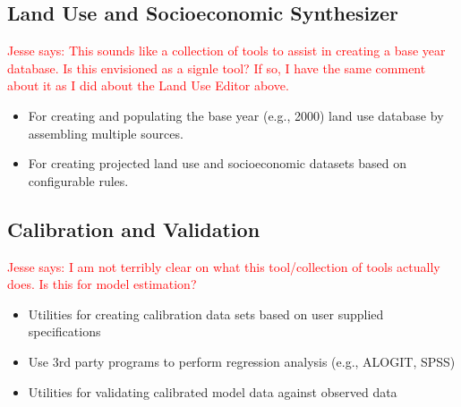 \documentclass[titlepage]{article}
\begin{document}
\subsection{Land Use and Socioeconomic Synthesizer}
\textcolor{red}{Jesse says: This sounds like a collection of tools to assist in creating a base year database.  Is this envisioned as a signle tool?  If so, I have the same comment about it as I did about the Land Use Editor above.}
\begin{itemize}
	\item For creating and populating the base year (e.g., 2000) land use database by assembling multiple sources.
	\item For creating projected land use and socioeconomic datasets based on configurable rules. 
\end{itemize}

\subsection{Calibration and Validation}
\textcolor{red}{Jesse says: I am not terribly clear on what this tool/collection of tools actually does.  Is this for model estimation?}
\begin{itemize}
	\item Utilities for creating calibration data sets based on user supplied specifications
	\item Use 3rd party programs to perform regression analysis (e.g., ALOGIT, SPSS)
	\item Utilities for validating calibrated model data against observed data
\end{itemize}
\end{document}
